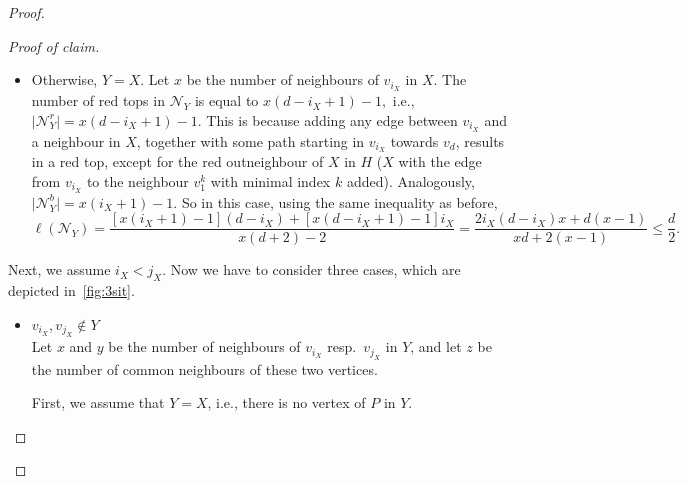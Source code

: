 \documentclass[11pt]{article}
\theoremstyle{definition}
\newcommand{\ny}{\mathcal N_{Y}}
\newcommand*{\abs}[1]{\lvert #1\rvert}
\newenvironment{poc}{\begin{proof}[Proof of claim]\renewcommand*{\qedsymbol}{$\blacksquare$}}{\end{proof}}
\begin{document}
\begin{proof}
\begin{poc}
\begin{itemize}
            \item Otherwise, $Y=X$. Let $x$ be the number of neighbours of $v_{i_X}$ in $X$.
            The number of red tops in $\ny$ is equal to $x(d-i_X+1)-1,$ i.e., $\abs{\ny^r}=x(d-i_X+1)-1.$
            This is because adding any edge between $v_{i_X}$ and a neighbour in $X$, together with some path starting in $v_{i_X}$ towards $v_{d}$, results in a red top, except for the red outneighbour of $X$ in $H$ ($X$ with the edge from $v_{i_X}$ to the neighbour $v_1^k$ with minimal index $k$ added).
            Analogously, $\abs{\ny^b}=x(i_X+1)-1.$ %
            So in this case, using the same inequality as before,
            $$\ell(\ny)=\frac{ [x(i_X+1)-1](d-i_X)+[x(d-i_X+1)-1]i_X}{x(d+2)-2} = \frac{2i_X(d-i_X)x +d(x-1)}{xd+2(x-1)} \le \frac{ d}{2}. $$   
        \end{itemize}
        Next, we assume $i_X<j_X.$
        Now we have to consider three cases, which are depicted in~\cref{fig:3sit}.
        \begin{itemize}
            \item $v_{i_X}, v_{j_X} \not \in Y$\\
            Let $x$ and $y$ be the number of neighbours of $v_{i_X}$ resp.~$v_{j_X}$ in $Y$, and let $z$ be the number of common neighbours of these two vertices.

            First, we assume that $Y=X$, i.e., there is no vertex of $P$ in $Y$.
            

\end{itemize}
\end{poc}
\end{proof}
\end{document}

